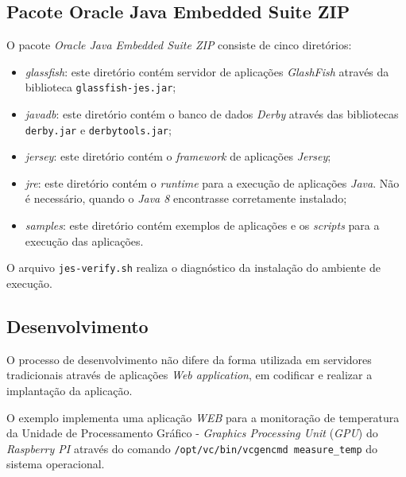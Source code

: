 \subsection{Pacote Oracle Java Embedded Suite ZIP}

O pacote \textit{Oracle Java Embedded Suite ZIP} consiste de cinco diretórios:

\begin{itemize}

    \item \textit{glassfish}: este diretório contém servidor de aplicações
    \textit{GlashFish} através da biblioteca \verb|glassfish-jes.jar|;

    \item \textit{javadb}: este diretório contém o banco de dados
    \textit{Derby} através das bibliotecas \verb|derby.jar| e
    \verb|derbytools.jar|;

    \item \textit{jersey}: este diretório contém o \textit{framework} de
    aplicações \textit{Jersey};

    \item \textit{jre}: este diretório contém o \textit{runtime} para a
    execução de aplicações \textit{Java}. Não é necessário, quando o
    \textit{Java 8} encontrasse corretamente instalado;

    \item \textit{samples}: este diretório contém exemplos de aplicações e os
    \textit{scripts} para a execução das aplicações.

\end{itemize}

O arquivo \verb|jes-verify.sh| realiza o diagnóstico da instalação do ambiente
de execução.

\subsection{Desenvolvimento}

O processo de desenvolvimento não difere da forma utilizada em servidores
tradicionais através de aplicações \textit{Web application}, em codificar e
realizar a implantação da aplicação.

O exemplo implementa uma aplicação \textit{WEB} para a monitoração de
temperatura da Unidade de Processamento Gráfico - \textit{Graphics Processing
  Unit} (\textit{GPU}) do \textit{Raspberry PI} através do comando
\verb|/opt/vc/bin/vcgencmd measure_temp| do sistema operacional.

